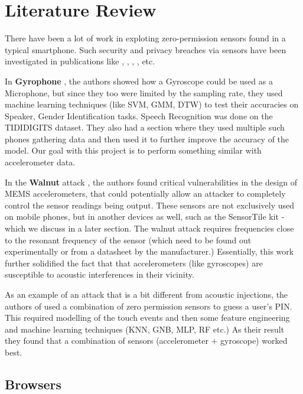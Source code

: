 \chapter{Literature Review}

There have been a lot of work in exploting zero-permission sensors found in a typical smartphone. Such security and privacy breaches via sensors have been investigated in publications like \cite{gyrophone}, \cite{walnut}, \cite{goespin}, \cite{spiphone}, \cite{accelprint} etc.

In \textbf{Gyrophone} \cite{gyrophone}, the authors showed how a Gyroscope could be used as a Microphone, but since they too were limited by the sampling rate, they used machine learning techniques (like SVM, GMM, DTW) to test their accuracies on Speaker, Gender Identification tasks. Speech Recognition was done on the TIDIDIGITS dataset. They also had a section where they used multiple such phones gathering data and then used it to further improve the accuracy of the model. Our goal with this project is to perform something similar with accelerometer data.

In the \textbf{Walnut} attack \cite{walnut}, the authors found critical vulnerabilities in the design of MEMS accelerometers, that could potentially allow an attacker to completely control the sensor readings being output. These sensors are not exclusively used on mobile phones, but in another devices as well, such as the SensorTile kit - which we discuss in a later section. The walnut attack requires frequencies close to the resonant frequency of the sensor (which need to be found out experimentally or from a datasheet by the manufacturer.) Essentially, this work further solidified the fact that that accelerometers (like gyroscopes) are susceptible to acoustic interferences in their vicinity.

As an example of an attack that is a bit different from acoustic injections, the authors of \cite{goespin} used a combination of zero permission sensors to guess a user’s PIN. This required modelling of the touch events and then some feature engineering and machine learning techniques (KNN, GNB, MLP, RF etc.) As their result they found that a combination of sensors (accelerometer + gyroscope) worked best.

\newpage

\section{Browsers}

